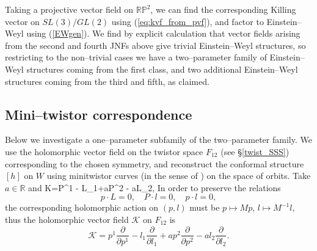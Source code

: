 Taking a projective vector field on $\mathbb{RP}^2$, we can find the corresponding Killing vector on $SL(3)/GL(2)$ using (\ref{eq:kvf_from_pvf}), and factor to Einstein--Weyl using (\ref{EWgen}). We find by explicit calculation that vector fields arising from the second and fourth JNFs above give trivial Einstein--Weyl structures, so restricting to the non--trivial cases we have a two--parameter family of Einstein--Weyl structures coming from the first class, and two additional Einstein--Weyl structures coming from the third and fifth, as claimed.
\koniec


\subsection{Mini--twistor correspondence}
\label{mini_twistor}
Below we investigate a one--parameter subfamily of the two--parameter family. We use the holomorphic vector field on 
the twistor space
$F_{12}$  (see \S\ref{twist_SSS})
corresponding to the chosen symmetry, and reconstruct the conformal structure $[h]$ on $W$ using minitwistor curves 
(in the sense of \cite{hitchin})
on the space of orbits. Take $a\in \mathbb{R}$ and
\be
\label{modelK}
K=P^1 - L_1+aP^2 - aL_2,
\ee
In order to preserve the relations
\[
p\cdot L=0,\quad P\cdot l=0,\quad p\cdot l=0, 
\]
the corresponding holomorphic action on $(p,l)$ must be $p\mapsto Mp$, $l\mapsto M^{-1}l$, thus the holomorphic vector field $\mathcal{K}$ on $F_{12}$ is
\[
\mathcal{K}=p^1\frac{\partial}{\partial p^1} - l_1\frac{\partial}{\partial l_1}+ap^2\frac{\partial}{\partial p^2} - al_2\frac{\partial}{\partial l_2}.
\]

